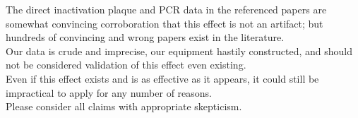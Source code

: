 \documentclass[paper.tex]{subfiles}
\begin{document}
\begin{autem}
\begin{quote}
\end{quote}

The direct inactivation plaque and PCR data in the referenced papers are somewhat convincing corroboration that this effect is not an artifact; but hundreds of convincing and wrong papers exist in the literature.\\

 Our data is crude and imprecise, our equipment hastily constructed, and should not be considered validation of this effect even existing. \\

Even if this effect exists and is as effective as it appears, it could still be impractical to apply for any number of reasons.\\


	Please consider all claims with appropriate skepticism.

\end{autem}
\end{document}
